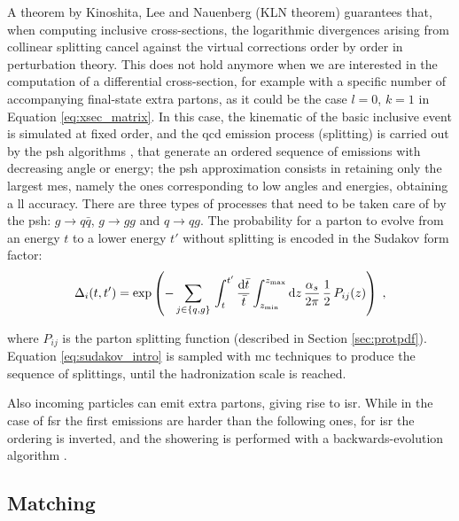 A theorem by Kinoshita, Lee and Nauenberg (KLN theorem) \cite{Kinoshita:1962ur,Lee:1964is} guarantees that, 
when computing inclusive cross-sections, the logarithmic divergences arising from collinear splitting cancel against the virtual corrections order by order in perturbation theory. 
This does not hold anymore when we are interested in the computation of a differential cross-section, for example with a specific number of accompanying final-state extra partons, 
as it could be the case $l=0$, $k=1$ in Equation \ref{eq:xsec_matrix}. 
In this case, the kinematic of the basic inclusive event is simulated at fixed order, and the \gls{qcd} emission process (splitting) is carried out by the \gls{psh} algorithms \cite{Fox:1979ag}, that generate an ordered sequence of emissions with decreasing angle or energy; the \gls{psh} approximation consists in retaining only the largest \glspl{me}, namely the ones corresponding to low angles and energies, obtaining a \gls{ll} accuracy.
There are three types of processes that need to be taken care of by the \gls{psh}: $g \rightarrow q\bar{q}$, $g \rightarrow gg$ and $q \rightarrow q g$.
The probability for a parton to evolve from an energy $t$ to a lower energy $t'$ without splitting is encoded in the Sudakov form factor:
\begin{equation}
  \Delta_i(t,t')=\exp\left(-\sum_{j\in\{q,g\}}\,
  \int_t^{t'}\frac{{\rm{d}}\bar{t}}{\bar{t}}\int_{z_{\rm min}}^{z_{\rm max}}{\rm{d}} z\,
  \frac{ \alpha_s }{2 \pi } \, \frac{1}{2} \, P_{ij}(z) \right) \;,
  \label{eq:sudakov_intro}
\end{equation}

\noindent where $P_{ij}$ is the parton splitting function (described in Section \ref{sec:protpdf}).
Equation \ref{eq:sudakov_intro} is sampled with \gls{mc} techniques to produce the sequence of splittings, until the hadronization scale is reached. 

Also incoming particles can emit extra partons, giving rise to \gls{isr}. While in the case of \gls{fsr} the first emissions are harder than the following ones, for \gls{isr} the ordering is inverted, and the showering is performed with a backwards-evolution algorithm \cite{Sjostrand:1985xi}.

\subsection{Matching}


